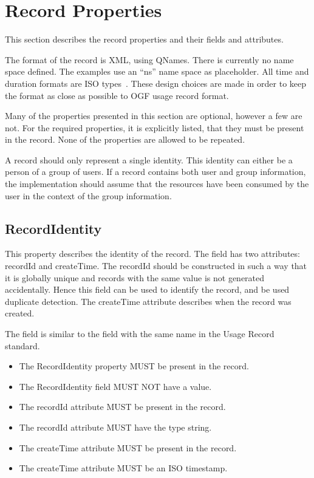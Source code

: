 
\section{Record Properties}

This section describes the record properties and their fields and attributes.

The format of the record is XML, using QNames. There is currently no name space
defined. The examples use an ``ns'' name space as placeholder. All time and
duration formats are ISO types~\cite{iso8601}. These design choices are made in
order to keep the format as close as possible to OGF usage record format.

Many of the properties presented in this section are optional, however a few
are not. For the required properties, it is explicitly listed, that they must
be present in the record. None of the properties are allowed to be repeated.

A record should only represent a single identity. This identity can either be a
person of a group of users. If a record contains both user and group
information, the implementation should assume that the resources have been
consumed by the user in the context of the group information.




\subsection{RecordIdentity}

This property describes the identity of the record. The field has two
attributes: recordId and createTime. The recordId should be constructed in such
a way that it is globally unique and records with the same value is not
generated accidentally. Hence this field can be used to identify the record,
and be used duplicate detection. The createTime attribute describes when the
record was created.

The field is similar to the field with the same name in the Usage Record
standard.

\begin{itemize}
\item The RecordIdentity property MUST be present in the record.
\item The RecordIdentity field MUST NOT have a value.
\item The recordId attribute MUST be present in the record.
\item The recordId attribute MUST have the type string.
\item The createTime attribute MUST be present in the record.
\item The createTime attribute MUST be an ISO timestamp.
\end{itemize}

